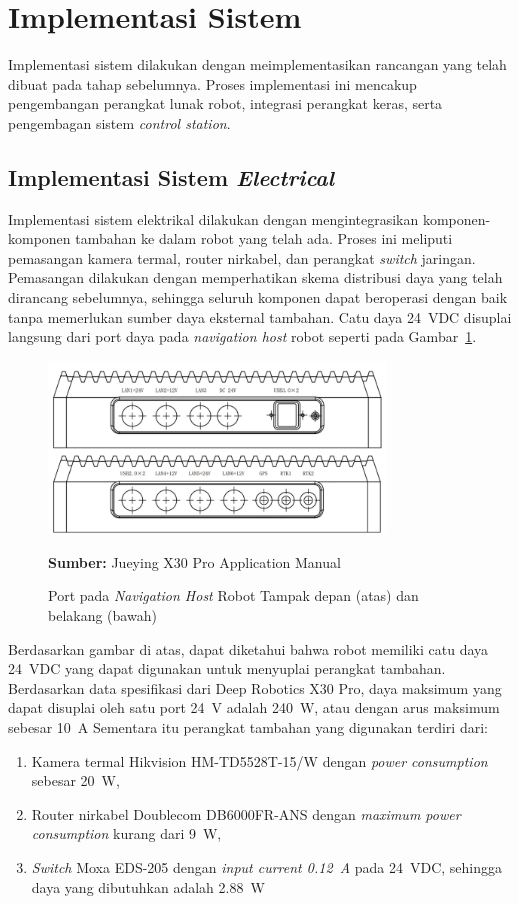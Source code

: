 \section{Implementasi Sistem}
\sloppy
Implementasi sistem dilakukan dengan meimplementasikan rancangan yang telah dibuat pada tahap sebelumnya. Proses implementasi ini mencakup pengembangan perangkat lunak robot, integrasi perangkat keras, serta pengembagan sistem \emph{control station}.

\subsection{Implementasi Sistem \emph{Electrical}}
Implementasi sistem elektrikal dilakukan dengan mengintegrasikan komponen-komponen tambahan ke dalam robot yang telah ada. Proses ini meliputi pemasangan kamera termal, router nirkabel, dan perangkat \emph{switch} jaringan. Pemasangan dilakukan dengan memperhatikan skema distribusi daya yang telah dirancang sebelumnya, sehingga seluruh komponen dapat beroperasi dengan baik tanpa memerlukan sumber daya eksternal tambahan. Catu daya 24~VDC disuplai langsung dari port daya pada \emph{navigation host} robot seperti pada Gambar~\ref{fig:int-control-port}. 

\begin{figure}[H]
  \centering
  \includegraphics[width=0.8\textwidth]{gambar/bab3/int-control-port.png}
  \caption{Port pada \emph{Navigation Host} Robot  Tampak depan (atas) dan belakang (bawah)}
  \label{fig:int-control-port}
  \footnotesize{\textbf{Sumber:} Jueying X30 Pro Application Manual}
\end{figure}

Berdasarkan gambar di atas, dapat diketahui bahwa robot memiliki catu daya 24~VDC yang dapat digunakan untuk menyuplai perangkat tambahan. Berdasarkan data spesifikasi dari Deep Robotics X30 Pro, daya maksimum yang dapat disuplai oleh satu port 24~V adalah 240~W, atau dengan arus maksimum sebesar 10~A  Sementara itu perangkat tambahan yang digunakan terdiri dari:
\begin{enumerate}
  \item Kamera termal Hikvision HM-TD5528T-15/W dengan \emph{power consumption}  sebesar 20~W,
  \item Router nirkabel Doublecom DB6000FR-ANS dengan \emph{maximum power consumption} kurang dari 9~W,
  \item \emph{Switch} Moxa EDS-205  dengan \emph{input current 0.12~A} pada 24~VDC, sehingga daya yang dibutuhkan adalah 2.88~W
\end{enumerate}


